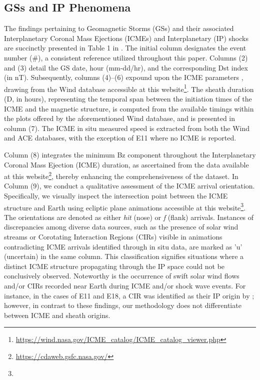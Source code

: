 \subsection{GSs and IP Phenomena} %
The findings pertaining to Geomagnetic Storms (GSs) and their associated Interplanetary Coronal Mass Ejections (ICMEs) and Interplanetary (IP) shocks are succinctly presented in Table 1 in \citet{miteva_2023}. The initial column designates the event number (\#), a consistent reference utilized throughout this paper. Columns (2) and (3) detail the GS date, hour (mm-dd/hr), and the corresponding Dst index (in nT). Subsequently, columns (4)–(6) expound upon the ICME parameters \citep{nieves_2018}, drawing from the Wind database accessible at this website\footnote{\url{https://wind.nasa.gov/ICME_catalog/ICME_catalog_viewer.php}}. The sheath duration (D, in hours), representing the temporal span between the initiation times of the ICME and the magnetic structure, is computed from the available timings within the plots offered by the aforementioned Wind database, and is presented in column (7). The ICME in situ measured speed is extracted from both the Wind and ACE databases, with the exception of E11 where no ICME is reported.

Column (8) integrates the minimum Bz component throughout the Interplanetary Coronal Mass Ejection (ICME) duration, as ascertained from the data available at this website\footnote{\url{https://cdaweb.gsfc.nasa.gov/}}, thereby enhancing the comprehensiveness of the dataset. In Column (9), we conduct a qualitative assessment of the ICME arrival orientation. Specifically, we visually inspect the intersection point between the ICME structure and Earth using ecliptic plane animations accessible at this website\footnote{\helioweatherurl}. The orientations are denoted as either \textit{hit} (nose) or \textit{f} (flank) arrivals. Instances of discrepancies among diverse data sources, such as the presence of solar wind streams or Corotating Interaction Regions (CIRs) visible in animations contradicting ICME arrivals identified through in situ data, are marked as 'u' (uncertain) in the same column. This classification signifies situations where a distinct ICME structure propagating through the IP space could not be conclusively observed. Noteworthy is the occurrence of swift solar wind flows and/or CIRs recorded near Earth during ICME and/or shock wave events. For instance, in the cases of E11 and E18, a CIR was identified as their IP origin by \citet{qiu_2022}; however, in contrast to these findings, our methodology does not differentiate between ICME and sheath origins.

